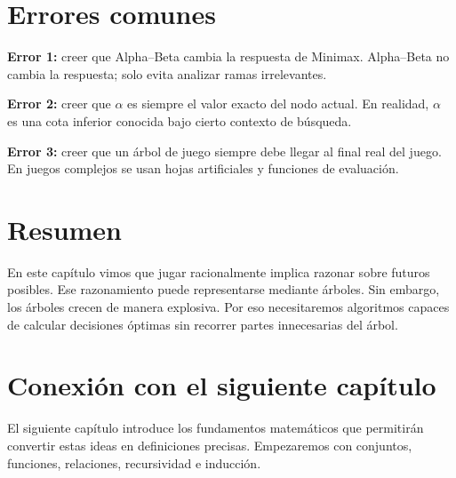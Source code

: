 \section{Errores comunes}

\begin{warningbox}
\textbf{Error 1:} creer que Alpha--Beta cambia la respuesta de Minimax. Alpha--Beta no cambia la respuesta; solo evita analizar ramas irrelevantes.

\textbf{Error 2:} creer que $\alpha$ es siempre el valor exacto del nodo actual. En realidad, $\alpha$ es una cota inferior conocida bajo cierto contexto de búsqueda.

\textbf{Error 3:} creer que un árbol de juego siempre debe llegar al final real del juego. En juegos complejos se usan hojas artificiales y funciones de evaluación.
\end{warningbox}

\section{Resumen}

En este capítulo vimos que jugar racionalmente implica razonar sobre futuros posibles. Ese razonamiento puede representarse mediante árboles. Sin embargo, los árboles crecen de manera explosiva. Por eso necesitaremos algoritmos capaces de calcular decisiones óptimas sin recorrer partes innecesarias del árbol.

\section{Conexión con el siguiente capítulo}

El siguiente capítulo introduce los fundamentos matemáticos que permitirán convertir estas ideas en definiciones precisas. Empezaremos con conjuntos, funciones, relaciones, recursividad e inducción.
